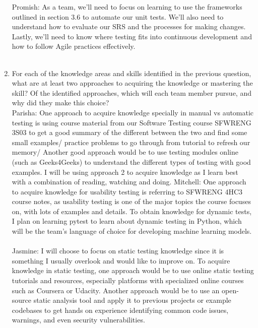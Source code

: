 \documentclass[12pt, titlepage]{article}
\begin{document}
\begin{enumerate}
  \hspace{2em} Promish: As a team, we’ll need to focus on learning to use the frameworks outlined 
  in section 3.6 to automate our unit tests. We’ll also need to understand how to evaluate our 
  SRS and the processes for making changes. Lastly, we’ll need to know where testing fits 
  into continuous development and how to follow Agile practices effectively.\\\\
  \item For each of the knowledge areas and skills identified in the previous
  question, what are at least two approaches to acquiring the knowledge or
  mastering the skill?  Of the identified approaches, which will each team
  member pursue, and why did they make this choice?\\
  \newline
  \hspace{2em} Parisha: One approach to acquire knowledge specially in manual vs automatic testing is using course material from our Software Testing course SFWRENG 3S03
  to get a good summary of the different between the two and find some small examples/ practice problems to go through from tutorial to refresh our memory/ 
  Another good approach would be to use testing modules online (such as Geeks4Geeks) to understand the different types of testing with good examples.
  I will be using approach 2 to acquire knowledge as I learn best with a combination of reading, watching and doing. 
  \hspace{2em} Mitchell: One approach to acquire knowledge for usability testing is referring to SFWRENG 4HC3 course notes,
  as usability testing is one of the major topics the course focuses on, with lots of examples and details. To obtain knowledge for dynamic tests, I plan on learning pytest to learn about dynamic testing in Python, which will be the
  team's language of choice for developing machine learning models.\\\\
  \hspace{2em} Jasmine: I will choose to focus on static testing knowledge since it is something I usually overlook 
  and would like to improve on. To acquire knowledge in static testing, one approach would be to use online static 
  testing tutorials and resources, especially platforms with specialized online courses such as Coursera or Udacity. 
  Another approach would be to use an open-source static analysis tool and apply it to previous projects or example 
  codebases to get hands on experience identifying common code issues, warnings, and even security vulnerabilities.\\\\

\end{enumerate}
\end{document}
